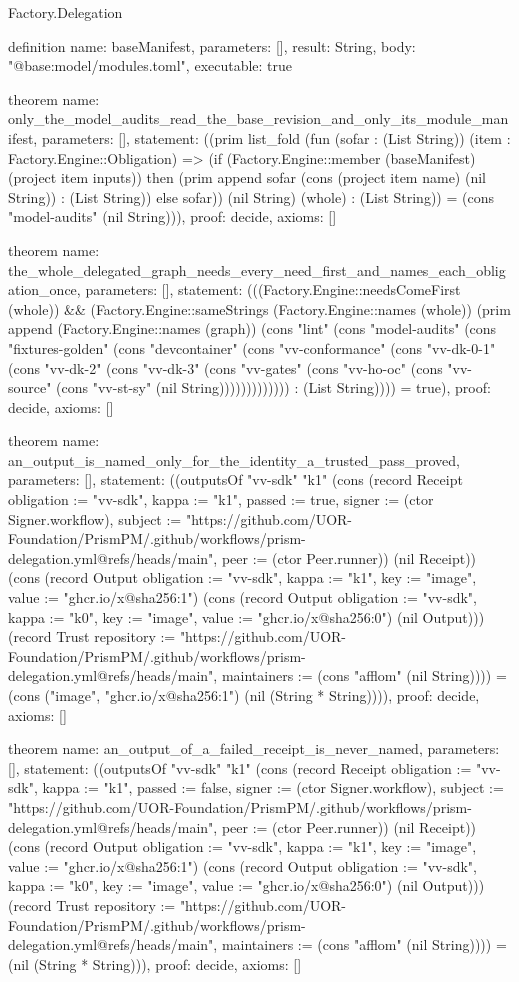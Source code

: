 \begin{lexlean}{Factory.Delegation}
\begin{semanticmodule}
definition{
  name: baseManifest,
  parameters: [],
  result: String,
  body: "@base:model/modules.toml",
  executable: true
}

theorem{
  name: only_the_model_audits_read_the_base_revision_and_only_its_module_manifest,
  parameters: [],
  statement: ((prim list_fold (fun (sofar : (List String)) (item : Factory.Engine::Obligation) => (if (Factory.Engine::member (baseManifest) (project item inputs)) then (prim append sofar (cons (project item name) (nil String)) : (List String)) else sofar)) (nil String) (whole) : (List String)) = (cons "model-audits" (nil String))),
  proof: decide{},
  axioms: []
}

theorem{
  name: the_whole_delegated_graph_needs_every_need_first_and_names_each_obligation_once,
  parameters: [],
  statement: (((Factory.Engine::needsComeFirst (whole)) && (Factory.Engine::sameStrings (Factory.Engine::names (whole)) (prim append (Factory.Engine::names (graph)) (cons "lint" (cons "model-audits" (cons "fixtures-golden" (cons "devcontainer" (cons "vv-conformance" (cons "vv-dk-0-1" (cons "vv-dk-2" (cons "vv-dk-3" (cons "vv-gates" (cons "vv-ho-oc" (cons "vv-source" (cons "vv-st-sy" (nil String))))))))))))) : (List String)))) = true),
  proof: decide{},
  axioms: []
}

theorem{
  name: an_output_is_named_only_for_the_identity_a_trusted_pass_proved,
  parameters: [],
  statement: ((outputsOf "vv-sdk" "k1" (cons (record Receipt {obligation := "vv-sdk", kappa := "k1", passed := true, signer := (ctor Signer.workflow), subject := "https://github.com/UOR-Foundation/PrismPM/.github/workflows/prism-delegation.yml@refs/heads/main", peer := (ctor Peer.runner)}) (nil Receipt)) (cons (record Output {obligation := "vv-sdk", kappa := "k1", key := "image", value := "ghcr.io/x@sha256:1"}) (cons (record Output {obligation := "vv-sdk", kappa := "k0", key := "image", value := "ghcr.io/x@sha256:0"}) (nil Output))) (record Trust {repository := "https://github.com/UOR-Foundation/PrismPM/.github/workflows/prism-delegation.yml@refs/heads/main", maintainers := (cons "afflom" (nil String))})) = (cons ("image", "ghcr.io/x@sha256:1") (nil (String * String)))),
  proof: decide{},
  axioms: []
}

theorem{
  name: an_output_of_a_failed_receipt_is_never_named,
  parameters: [],
  statement: ((outputsOf "vv-sdk" "k1" (cons (record Receipt {obligation := "vv-sdk", kappa := "k1", passed := false, signer := (ctor Signer.workflow), subject := "https://github.com/UOR-Foundation/PrismPM/.github/workflows/prism-delegation.yml@refs/heads/main", peer := (ctor Peer.runner)}) (nil Receipt)) (cons (record Output {obligation := "vv-sdk", kappa := "k1", key := "image", value := "ghcr.io/x@sha256:1"}) (cons (record Output {obligation := "vv-sdk", kappa := "k0", key := "image", value := "ghcr.io/x@sha256:0"}) (nil Output))) (record Trust {repository := "https://github.com/UOR-Foundation/PrismPM/.github/workflows/prism-delegation.yml@refs/heads/main", maintainers := (cons "afflom" (nil String))})) = (nil (String * String))),
  proof: decide{},
  axioms: []
}


\end{semanticmodule}
\end{lexlean}
